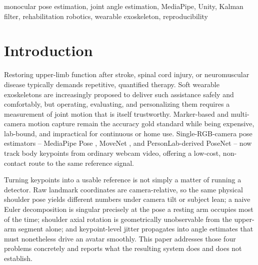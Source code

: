 \documentclass[conference]{IEEEtran}
\begin{document}
\begin{IEEEkeywords}
monocular pose estimation, joint angle estimation, MediaPipe, Unity,
Kalman filter, rehabilitation robotics, wearable exoskeleton,
reproducibility
\end{IEEEkeywords}

\section{Introduction}

Restoring upper-limb function after stroke, spinal cord injury, or
neuromuscular disease typically demands repetitive, quantified therapy.
Soft wearable exoskeletons are increasingly proposed to deliver such
assistance safely and comfortably, but operating, evaluating, and
personalizing them requires a measurement of joint motion that is itself
trustworthy. Marker-based and multi-camera motion capture remain the
accuracy gold standard while being expensive, lab-bound, and impractical
for continuous or home use. Single-RGB-camera pose estimators --
MediaPipe Pose \cite{bazarevsky2020blazepose}, MoveNet
\cite{movenet2021blog}, and PersonLab-derived PoseNet
\cite{papandreou2018personlab} -- now track body keypoints from ordinary
webcam video, offering a low-cost, non-contact route to the same
reference signal.

Turning keypoints into a usable reference is not simply a matter of
running a detector. Raw landmark coordinates are camera-relative, so the
same physical shoulder pose yields different numbers under camera tilt or
subject lean; a naive Euler decomposition is singular precisely at the
pose a resting arm occupies most of the time; shoulder axial rotation is
geometrically unobservable from the upper-arm segment alone; and
keypoint-level jitter propagates into angle estimates that must
nonetheless drive an avatar smoothly. This paper addresses those four
problems concretely and reports what the resulting system does and does
not establish.
\end{document}
